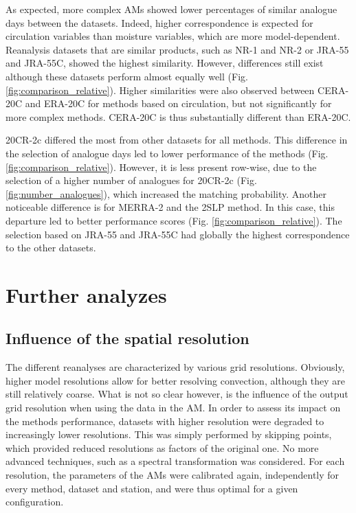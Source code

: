 \documentclass{ametsoc}
\begin{document}
As expected, more complex AMs showed lower percentages of similar analogue days between the datasets. Indeed, higher correspondence is expected for circulation variables than moisture variables, which are more model-dependent. Reanalysis datasets that are similar products, such as NR-1 and NR-2 or JRA-55 and JRA-55C, showed the highest similarity. However, differences still exist although these datasets perform almost equally well (Fig. \ref{fig:comparison_relative}). Higher similarities were also observed between CERA-20C and ERA-20C for methods based on circulation, but not significantly for more complex methods. CERA-20C is thus substantially different than ERA-20C.

20CR-2c differed the most from other datasets for all methods. This difference in the selection of analogue days led to lower performance of the methods (Fig. \ref{fig:comparison_relative}). However, it is less present row-wise, due to the selection of a higher number of analogues for 20CR-2c (Fig. \ref{fig:number_analogues}), which increased the matching probability. Another noticeable difference is for MERRA-2 and the 2SLP method. In this case, this departure led to better performance scores (Fig. \ref{fig:comparison_relative}). The selection based on JRA-55 and JRA-55C had globally the highest correspondence to the other datasets.


\section{Further analyzes}
\label{sec:analyzes}

\subsection{Influence of the spatial resolution}
\label{sec:resolution}

The different reanalyses are characterized by various grid resolutions. Obviously, higher model resolutions allow for better resolving convection, although they are still relatively coarse. What is not so clear however, is the influence of the output grid resolution when using the data in the AM. In order to assess its impact on the methods performance, datasets with higher resolution were degraded to increasingly lower resolutions. This was simply performed by skipping points, which provided reduced resolutions as factors of the original one. No more advanced techniques, such as a spectral transformation was considered. For each resolution, the parameters of the AMs were calibrated again, independently for every method, dataset and station, and were thus optimal for a given configuration. 
\end{document}
